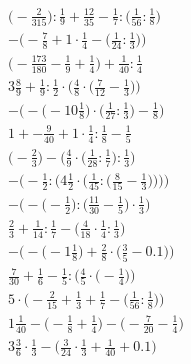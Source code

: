 \documentclass[8pt]{article}
\begin{document}
\begin{align}
\big(-\frac{2}{315}\big) : \frac{1}{9} + \frac{12}{35} - \frac{1}{7} : \big(\frac{1}{56} : \frac{1}{8}\big) \\
-\Big(-\frac{7}{8} + 1 \cdot \frac{1}{4} - \big(\frac{1}{24} : \frac{1}{3}\big)\Big) \\
\big(-\frac{173}{180} - \frac{1}{9} + \frac{1}{4}\big) + \frac{1}{40} : \frac{1}{4} \\
3\frac{8}{9} + \frac{1}{9} : \frac{1}{2} \cdot \Big(\frac{4}{8} \cdot \big(\frac{7}{12} - \frac{1}{3}\big)\Big) \\
-\Big(-\big(-10\frac{1}{8}\big) \cdot \big(\frac{1}{27} : \frac{1}{3}\big) - \frac{1}{8}\Big) \\
1 + -\frac{9}{40} + 1 \cdot \frac{1}{4} : \frac{1}{8} - \frac{1}{5} \\
\Big(-\frac{2}{3}\Big) - \Big(\frac{4}{9} \cdot \big(\frac{1}{28} : \frac{1}{7}\big) : \frac{1}{3}\Big) \\
-\Bigg(-\frac{1}{2} : \bigg(4\frac{1}{2} \cdot \Big(\frac{1}{45} : \big(\frac{8}{15} - \frac{1}{3}\big)\Big)\bigg)\Bigg) \\
-\Big(-\big(-\frac{1}{2}\big) : \big(\frac{11}{30} - \frac{1}{5}\big) \cdot \frac{1}{3}\Big) \\
\frac{2}{3} + \frac{1}{14} : \frac{1}{7} - \big(\frac{4}{18} \cdot \frac{1}{4} : \frac{1}{3}\big) \\
-\Big(-\big(-1\frac{1}{8}\big) + \frac{2}{8} \cdot \big(\frac{3}{5} - 0.1\big)\Big) \\
\frac{7}{30} + \frac{1}{6} - \frac{1}{5} : \Big(\frac{4}{5} \cdot \big(-\frac{1}{4}\big)\Big) \\
5 \cdot \Big(-\frac{2}{15} + \frac{1}{3} + \frac{1}{7} - \big(\frac{1}{56} : \frac{1}{8}\big)\Big) \\
1\frac{1}{40} - \big(-\frac{1}{8} + \frac{1}{4}\big) - \big(-\frac{7}{20} - \frac{1}{4}\big) \\
3\frac{3}{6} \cdot \frac{1}{3} - \big(\frac{3}{24} \cdot \frac{1}{3} + \frac{1}{40} + 0.1\big)
\end{align}
\end{document}
